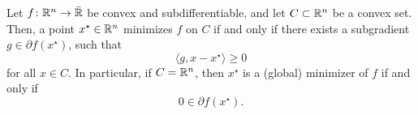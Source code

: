 \begin{proposition}
    \label{prop:first-order-condition-for-minimizer}
    Let $f\colon \mathbb{R}^n\to\bar{\mathbb{R}}$ be convex and subdifferentiable, and let $C\subset\mathbb{R}^n$ be a convex set.
    Then, a point $x^\star\in\mathbb{R}^n$ minimizes $f$ on $C$
    if and only if there exists a subgradient $g \in \partial f(x^\star)$, such that
    \[
        \langle g, x - x^\star \rangle \geq 0
    \]
    for all $x\in C$. In particular, if $C = \mathbb{R}^n$, then $x^\star$ is a (global) minimizer of $f$ if and only if
    \[
        0 \in \partial f(x^\star).
    \]
\end{proposition}

